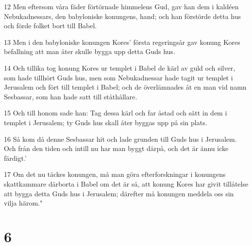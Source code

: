\par 12 Men eftersom våra fäder förtörnade himmelens Gud, gav han dem i kaldéen Nebukadnessars, den babyloniske konungens, hand; och han förstörde detta hus och förde folket bort till Babel.
\par 13 Men i den babyloniske konungen Kores' första regeringsår gav konung Kores befallning att man åter skulle bygga upp detta Guds hus.
\par 14 Och tillika tog konung Kores ur templet i Babel de kärl av guld och silver, som hade tillhört Guds hus, men som Nebukadnessar hade tagit ur templet i Jerusalem och fört till templet i Babel; och de överlämnades åt en man vid namn Sesbassar, som han hade satt till ståthållare.
\par 15 Och till honom sade han: Tag dessa kärl och far åstad och sätt in dem i templet i Jerusalem; ty Guds hus skall åter byggas upp på sin plats.
\par 16 Så kom då denne Sesbassar hit och lade grunden till Guds hus i Jerusalem. Och från den tiden och intill nu har man byggt därpå, och det är ännu icke färdigt.'
\par 17 Om det nu täckes konungen, må man göra efterforskningar i konungens skattkammare därborta i Babel om det är så, att konung Kores har givit tillåtelse att bygga detta Guds hus i Jerusalem; därefter må konungen meddela oss sin vilja härom."

\chapter{6}

